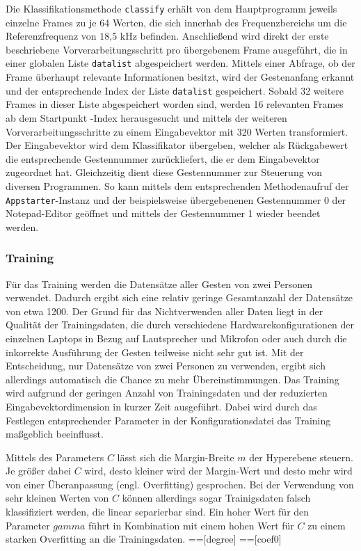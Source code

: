 Die Klassifikationsmethode \texttt{classify} erhält von dem Hauptprogramm jeweils einzelne Frames zu je 64 Werten, die sich innerhab des Frequenzbereichs um die Referenzfrequenz von $18\text{,}5\text{ kHz}$ befinden.
Anschließend wird direkt der erste beschriebene Vorverarbeitungsschritt pro übergebenem Frame ausgeführt, die in einer globalen Liste \texttt{datalist} abgespeichert werden.
Mittels einer Abfrage, ob der Frame überhaupt relevante Informationen besitzt, wird der Gestenanfang erkannt und der entsprechende Index der Liste \texttt{datalist} gespeichert.
Sobald 32 weitere Frames in dieser Liste abgespeichert worden sind, werden 16 relevanten Frames ab dem Startpunkt -Index herausgesucht und mittels der weiteren Vorverarbeitungsschritte zu einem Eingabevektor mit 320 Werten transformiert.
Der Eingabevektor wird dem Klassifikator übergeben, welcher als Rückgabewert die entsprechende Gestennummer zurückliefert, die er dem Eingabevektor zugeordnet hat.
Gleichzeitig dient diese Gestennummer zur Steuerung von diversen Programmen.
So kann mittels dem entsprechenden Methodenaufruf der \texttt{Appstarter}-Instanz und der beispielsweise übergebenenen Gestennummer 0 der Notepad-Editor geöffnet und mittels der Gestennummer 1 wieder beendet werden.

\subsubsection{Training}\label{sec:svm_training}
Für das Training werden die Datensätze aller Gesten von zwei Personen verwendet.
Dadurch ergibt sich eine relativ geringe Gesamtanzahl der Datensätze von etwa 1200.
Der Grund für das Nichtverwenden aller Daten liegt in der Qualität der Trainingsdaten, die durch verschiedene Hardwarekonfigurationen der einzelnen Laptops in Bezug auf Lautsprecher und Mikrofon oder auch durch die inkorrekte Ausführung der Gesten teilweise nicht sehr gut ist.
Mit der Entscheidung, nur Datensätze von zwei Personen zu verwenden, ergibt sich allerdings automatisch die Chance zu mehr Übereinstimmungen.
Das Training wird aufgrund der geringen Anzahl von Trainingsdaten und der reduzierten Eingabevektordimension in kurzer Zeit ausgeführt.
Dabei wird durch das Festlegen entsprechender Parameter in der Konfigurationsdatei das Training maßgeblich beeinflusst. 

Mittels des Parameters $C$ lässt sich die Margin-Breite $m$ der Hyperebene steuern.
Je größer dabei $C$ wird, desto kleiner wird der Margin-Wert und desto mehr wird von einer Überanpassung (engl. Overfitting) gesprochen.
Bei der Verwendung von sehr kleinen Werten von $C$ können allerdings sogar Trainigsdaten falsch klassifiziert werden, die linear separierbar sind.
Ein hoher Wert für den Parameter $gamma$ führt in Kombination mit einem hohen Wert für $C$ zu einem starken Overfitting an die Trainingsdaten.
==[degree]
==[coef0]


